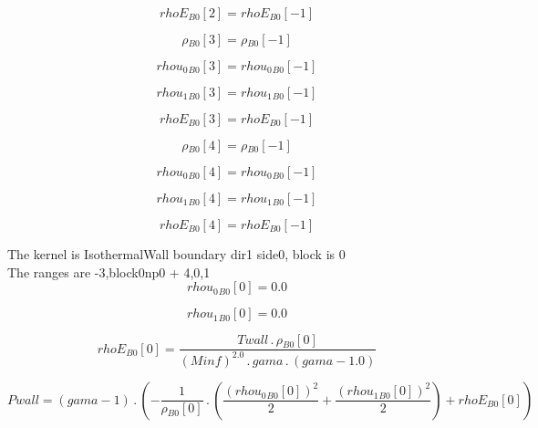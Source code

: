 \documentclass{article}
\begin{document}
\begin{dmath}{rhoE{_{B0}}}[{2}] = {rhoE{_{B0}}}[{-1}]\end{dmath}

\begin{dmath}{\rho{_{B0}}}[{3}] = {\rho{_{B0}}}[{-1}]\end{dmath}

\begin{dmath}{rhou_{0}{_{B0}}}[{3}] = {rhou_{0}{_{B0}}}[{-1}]\end{dmath}

\begin{dmath}{rhou_{1}{_{B0}}}[{3}] = {rhou_{1}{_{B0}}}[{-1}]\end{dmath}

\begin{dmath}{rhoE{_{B0}}}[{3}] = {rhoE{_{B0}}}[{-1}]\end{dmath}

\begin{dmath}{\rho{_{B0}}}[{4}] = {\rho{_{B0}}}[{-1}]\end{dmath}

\begin{dmath}{rhou_{0}{_{B0}}}[{4}] = {rhou_{0}{_{B0}}}[{-1}]\end{dmath}

\begin{dmath}{rhou_{1}{_{B0}}}[{4}] = {rhou_{1}{_{B0}}}[{-1}]\end{dmath}

\begin{dmath}{rhoE{_{B0}}}[{4}] = {rhoE{_{B0}}}[{-1}]\end{dmath}

\noindent The kernel is IsothermalWall boundary dir1 side0, block is 0\\\noindent The ranges are -3,block0np0 + 4,0,1\\\begin{dmath}{rhou_{0}{_{B0}}}[{0}] = 0.0\end{dmath}

\begin{dmath}{rhou_{1}{_{B0}}}[{0}] = 0.0\end{dmath}

\begin{dmath}{rhoE{_{B0}}}[{0}] = \frac{Twall \,.\, {\rho{_{B0}}}[{0}]}{\left(Minf \right)^{2.0} \,.\, gama \,.\, \left(gama - 1.0\right)}\end{dmath}

\begin{dmath}Pwall = \left(gama - 1\right) \,.\, \left(- \frac{1}{{\rho{_{B0}}}[{0}]} \,.\, \left(\frac{\left({rhou_{0}{_{B0}}}[{0}] \right)^{2}}{2} + \frac{\left({rhou_{1}{_{B0}}}[{0}] \right)^{2}}{2}\right) + {rhoE{_{B0}}}[{0}]\right)\end{dmath}
\end{document}
